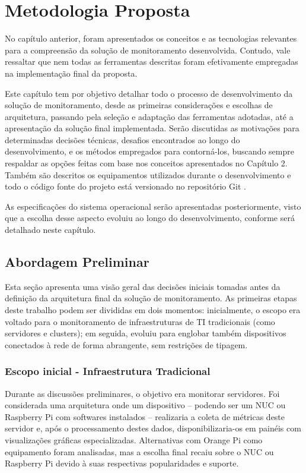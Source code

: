 \chapter{Metodologia Proposta}
\label{chap3}

No capítulo anterior, foram apresentados os conceitos e as tecnologias relevantes para a compreensão da solução de monitoramento desenvolvida. Contudo, vale ressaltar que nem todas as ferramentas descritas foram efetivamente empregadas na implementação final da proposta.

Este capítulo tem por objetivo detalhar todo o processo de desenvolvimento da solução de monitoramento, desde as primeiras considerações e escolhas de arquitetura, passando pela seleção e adaptação das ferramentas adotadas, até a apresentação da solução final implementada. Serão discutidas as motivações para determinadas decisões técnicas, desafios encontrados ao longo do desenvolvimento, e os métodos empregados para contorná-los, buscando sempre respaldar as opções feitas com base nos conceitos apresentados no Capítulo 2. Também são descritos os equipamentos utilizados durante o desenvolvimento e todo o código fonte do projeto está versionado no repositório Git \citep{vitorcossetti2025}.

As especificações do sistema operacional serão apresentadas posteriormente, visto que a escolha desse aspecto evoluiu ao longo do desenvolvimento, conforme será detalhado neste capítulo.

\section{Abordagem Preliminar}
\label{section:AbordagemPreliminar}

Esta seção apresenta uma visão geral das decisões iniciais tomadas antes da definição da arquitetura final da solução de monitoramento. As primeiras etapas deste trabalho podem ser divididas em dois momentos: inicialmente, o escopo era voltado para o monitoramento de infraestruturas de TI tradicionais (como servidores e clusters); em seguida, evoluiu para englobar também dispositivos conectados à rede de forma abrangente, sem restrições de tipagem.

\subsection{Escopo inicial - Infraestrutura Tradicional}
\label{subsection:EscopoInicial}

Durante as discussões preliminares, o objetivo era monitorar servidores. Foi considerada uma arquitetura onde um dispositivo -- podendo ser um NUC ou Raspberry Pi com softwares instalados -- realizaria a coleta de métricas deste servidor e, após o processamento destes dados, disponibilizaria-os em painéis com visualizações gráficas especializadas. Alternativas com Orange Pi como equipamento foram analisadas, mas a escolha final recaiu sobre o NUC ou Raspberry Pi devido à suas respectivas popularidades e suporte.

